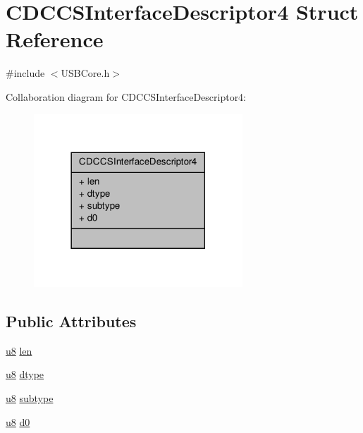 \hypertarget{struct_c_d_c_c_s_interface_descriptor4}{\section{C\-D\-C\-C\-S\-Interface\-Descriptor4 Struct Reference}
\label{struct_c_d_c_c_s_interface_descriptor4}
}


{\ttfamily \#include $<$U\-S\-B\-Core.\-h$>$}



Collaboration diagram for C\-D\-C\-C\-S\-Interface\-Descriptor4\-:
\nopagebreak
\begin{figure}[H]
\begin{center}
\leavevmode
\includegraphics[width=222pt]{struct_c_d_c_c_s_interface_descriptor4__coll__graph}
\end{center}
\end{figure}
\subsection*{Public Attributes}
\begin{DoxyCompactItemize}
\item 
\hyperlink{_platform_8h_aed742c436da53c1080638ce6ef7d13de}{u8} \hyperlink{struct_c_d_c_c_s_interface_descriptor4_ab89f7893f8e283d7f1fb84e43893766e}{len}
\item 
\hyperlink{_platform_8h_aed742c436da53c1080638ce6ef7d13de}{u8} \hyperlink{struct_c_d_c_c_s_interface_descriptor4_a17152b2ca4d4535c5f9213c75765f117}{dtype}
\item 
\hyperlink{_platform_8h_aed742c436da53c1080638ce6ef7d13de}{u8} \hyperlink{struct_c_d_c_c_s_interface_descriptor4_a4cc0147f4d3e90e2c17a830ea5eff849}{subtype}
\item 
\hyperlink{_platform_8h_aed742c436da53c1080638ce6ef7d13de}{u8} \hyperlink{struct_c_d_c_c_s_interface_descriptor4_ad89b10b6c73a0c8c5df3fe5aae322957}{d0}
\end{DoxyCompactItemize}



